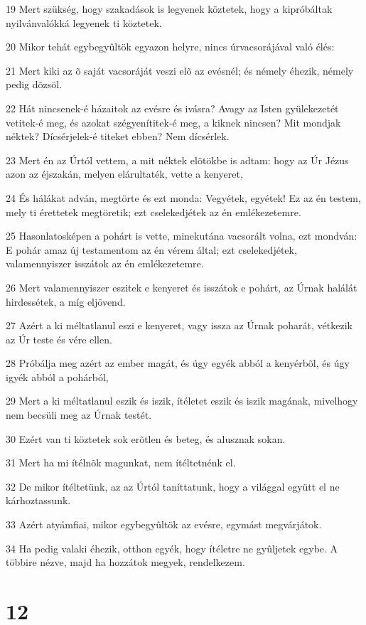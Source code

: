 \par 19 Mert szükség, hogy szakadások is legyenek köztetek, hogy a kipróbáltak nyilvánvalókká legyenek  ti köztetek.
\par 20 Mikor tehát egybegyûltök egyazon helyre, nincs úrvacsorájával való élés:
\par 21 Mert kiki az õ saját vacsoráját veszi elõ az evésnél; és némely éhezik, némely pedig dõzsöl.
\par 22 Hát nincsenek-é házaitok az evésre és ivásra? Avagy az Isten gyülekezetét vetitek-é meg, és azokat szégyenítitek-é meg, a kiknek nincsen? Mit mondjak néktek? Dícsérjelek-é titeket ebben? Nem dícsérlek.
\par 23 Mert én az Úrtól vettem, a mit néktek elõtökbe is adtam: hogy az Úr Jézus  azon az éjszakán, melyen elárultaték, vette a kenyeret,
\par 24 És hálákat adván, megtörte és ezt monda: Vegyétek, egyétek! Ez az én testem, mely ti érettetek megtöretik; ezt cselekedjétek az én emlékezetemre.
\par 25 Hasonlatosképen a pohárt is vette, minekutána vacsorált volna, ezt mondván: E pohár amaz új testamentom az én vérem által; ezt cselekedjétek, valamennyiszer isszátok az én emlékezetemre.
\par 26 Mert valamennyiszer eszitek e kenyeret és isszátok e pohárt, az Úrnak halálát hirdessétek, a míg eljövend.
\par 27 Azért a ki méltatlanul eszi e kenyeret, vagy issza az Úrnak poharát, vétkezik az Úr teste és vére ellen.
\par 28 Próbálja meg azért az ember magát, és úgy egyék abból a kenyérbõl, és úgy igyék abból a pohárból,
\par 29 Mert a ki méltatlanul eszik és iszik, ítéletet eszik és iszik magának, mivelhogy nem becsüli meg az Úrnak testét.
\par 30 Ezért van ti köztetek sok erõtlen és beteg, és alusznak sokan.
\par 31 Mert ha mi ítélnõk magunkat, nem ítéltetnénk el.
\par 32 De mikor ítéltetünk, az az Úrtól taníttatunk, hogy a világgal együtt el ne kárhoztassunk.
\par 33 Azért atyámfiai, mikor egybegyûltök az evésre, egymást megvárjátok.
\par 34 Ha pedig valaki éhezik, otthon egyék, hogy ítéletre ne gyûljetek egybe. A többire nézve, majd ha hozzátok megyek, rendelkezem.

\chapter{12}

